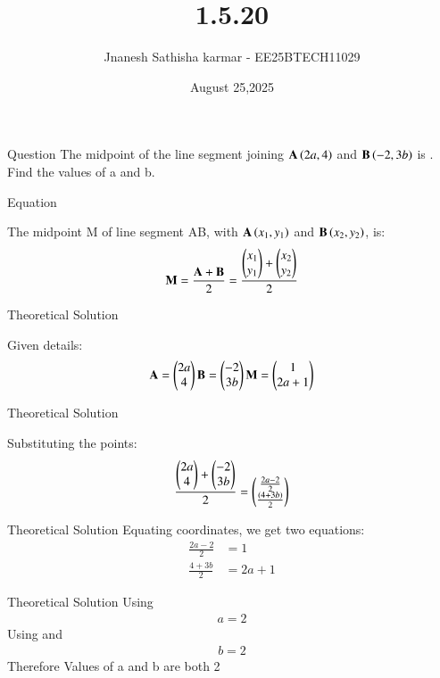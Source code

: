 \documentclass{beamer}
\title %
{1.5.20}
\date{August 25,2025}
\author 
{Jnanesh Sathisha karmar - EE25BTECH11029}
\begin{document}
\frame{\titlepage}
\begin{frame}{Question}
The midpoint of the line segment joining $\mathbf{A}\left(2a, 4\right)$ and $\mathbf{B}\left(-2, 3b\right)$ is . Find
the values of a and b.
\end{frame}



\begin{frame}{Equation}

The midpoint M of line segment AB, with $\mathbf{A}\left(x_1, y_1\right)$ and $\mathbf{B}\left(x_2, y_2\right)$, is:
\begin{align}
	\mathbf{M}=\frac{\mathbf{A}+\mathbf{B}}{2}=\frac{\begin{pmatrix}x_1\\y_1\end{pmatrix} + \begin{pmatrix}x_2\\y_2\end{pmatrix}}{2}
\end{align}

\end{frame}

\begin{frame}{Theoretical Solution}

Given details:
\begin{align}
    \mathbf{A}=\begin{pmatrix}2a\\4\end{pmatrix}  \mathbf{B}=\begin{pmatrix}-2\\3b\end{pmatrix} \mathbf{M}=\begin{pmatrix}1\\2a+1\end{pmatrix}
\end{align}
\end{frame}

\begin{frame}{Theoretical Solution}

Substituting the points:
\begin{align}
\frac{\begin{pmatrix}2a\\4\end{pmatrix} + \begin{pmatrix}-2\\3b\end{pmatrix}}{2}=\begin{pmatrix}\frac{2a-2}{2}\\ \frac{\left(4+3b\right)}{2}\end{pmatrix}
\end{align}

\end{frame}


\begin{frame}{Theoretical Solution}
Equating coordinates, we get two equations:
\begin{align}
\frac{2a - 2}{2} &= 1 \\
\frac{4 + 3b}{2} &= 2a + 1
\end{align}

\end{frame}
\begin{frame}{Theoretical Solution}
Using  
\begin{align}
    a=2
\end{align}
Using  and 
\begin{align}
    b=2
\end{align}
Therefore Values of a and b are both 2
\end{frame}
\end{document}
